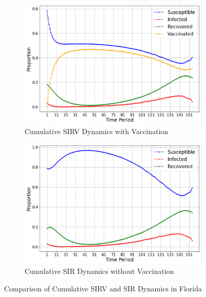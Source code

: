 \documentclass{article}
\begin{document}
\begin{figure}
    \centering
    \begin{subfigure}{0.43\linewidth}
        \centering
        \includegraphics[width=\linewidth]{pics/cumulSIRVDynamicsVax0.1.png}
        \caption{Cumulative SIRV Dynamics with Vaccination}\label{fig:sirvDynamicsVax}
    \end{subfigure}
    \hspace{2em}
    \begin{subfigure}{0.43\linewidth}
        \centering
        \includegraphics[width=\linewidth]{pics/cumulSIRVDynamicsNoVax.png}
        \caption{Cumulative SIR Dynamics without Vaccination}\label{fig:sirDynamicsNoVax}
    \end{subfigure}
    \caption{Comparison of Cumulative SIRV and SIR Dynamics in Florida}\label{fig:sirvDynamics}
\end{figure}
\end{document}
